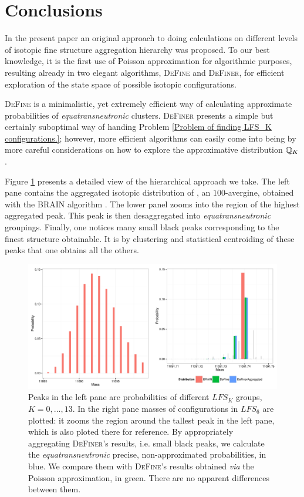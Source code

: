 \section{Conclusions}

	In the present paper an original approach to doing calculations on different levels of isotopic fine structure aggregation hierarchy was proposed. To our best knowledge, it is the first use of Poisson approximation for algorithmic purposes,   resulting already in two elegant algorithms, \textsc{DeFine} and \textsc{DeFiner}, for efficient exploration of the state space of possible isotopic configurations.  

	\textsc{DeFine} is a minimalistic, yet extremely efficient way of calculating approximate probabilities of {\it equatransneutronic} clusters. \textsc{DeFiner} presents a simple but certainly suboptimal way of handing Problem \ref{Problem of finding LFS_K configurations.}; however, more efficient algorithms can easily come into being by more careful considerations on how to explore the approximative distribution $\mathbb{Q}_K$. 

	Figure \ref{figure: hierarchy} presents a detailed view of the hierarchical approach we take. The left pane contains the  aggregated isotopic distribution of \testAvergine, an $100$-avergine, obtained with the {\sc BRAIN} algorithm \cite{Dittwald2013BRAIN}. The lower panel zooms into the region of the highest aggregated peak. This peak is then desaggregated into {\it equatransneutronic} groupings. Finally, one notices many small black peaks corresponding to the finest structure obtainable. It is by clustering and statistical centroiding of these peaks that one obtains all the others. 

\begin{figure}[htbp]
 \centering
 \includegraphics[width=\textwidth]{./img/hierarchyHorizontal}
 \caption{ Peaks in the left pane are probabilities of different $LFS_K$ groups, $K = 0,\dots,13$. In the right pane masses of configurations in $LFS_6$ are plotted: it zooms the region around the tallest peak in the left pane, which is also ploted there for reference. By appropriately aggregating \textsc{DeFiner}'s results, i.e. small black peaks, we calculate the {\it equatransneutronic} precise, non-approximated probabilities, in blue. We compare them with \textsc{DeFine}'s results obtained {\it via} the Poisson approximation, in green. There are no apparent differences between them. }
 \label{figure: hierarchy}
\end{figure}


